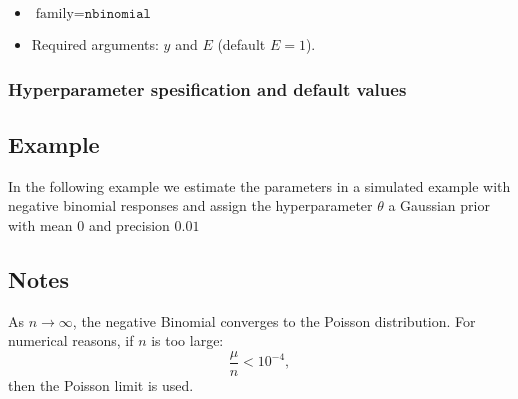 \documentclass[a4paper,11pt]{article}
\begin{document}
\begin{itemize}
\item $\text{family}=\texttt{nbinomial}$
\item Required arguments: $y$ and $E$ (default $E=1$).
\end{itemize}

\subsubsection*{Hyperparameter spesification and default values}



\subsection*{Example}

In the following example we estimate the parameters in a simulated
example with negative binomial responses and assign the hyperparameter
$\theta$ a Gaussian prior with mean $0$ and precision $0.01$


\subsection*{Notes}

As $n\rightarrow\infty$, the negative Binomial converges to the
Poisson distribution. For numerical reasons, if $n$ is too large:
\begin{displaymath}
    \frac{\mu}{n} < 10^{-4},
\end{displaymath}
then the Poisson limit is used.
\end{document}

